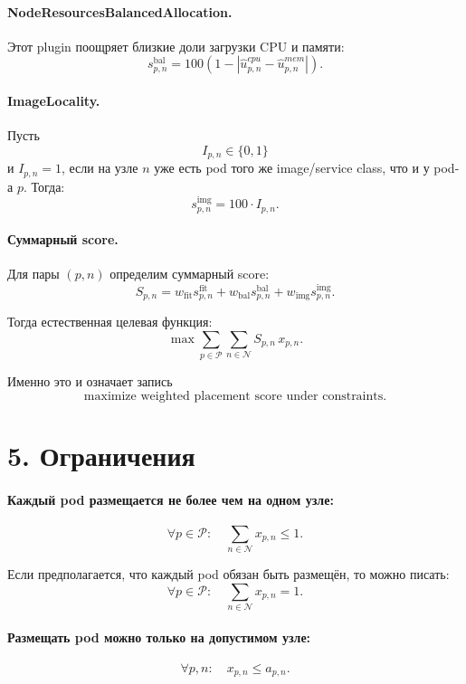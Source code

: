 \documentclass[11pt]{article}
\begin{document}
\paragraph{NodeResourcesBalancedAllocation.}
Этот plugin поощряет близкие доли загрузки CPU и памяти:
\[
  s_{p,n}^{\mathrm{bal}} =
  100\left(1 - \left|\hat{u}^{cpu}_{p,n} - \hat{u}^{mem}_{p,n}\right|\right).
\]

\paragraph{ImageLocality.}
Пусть
\[
  I_{p,n} \in \{0,1\}
\]
и \(I_{p,n}=1\), если на узле \(n\) уже есть pod того же image/service class,
что и у pod-а \(p\). Тогда:
\[
  s_{p,n}^{\mathrm{img}} = 100 \cdot I_{p,n}.
\]

\paragraph{Суммарный score.}
Для пары \((p,n)\) определим суммарный score:
\[
  S_{p,n}
  =
  w_{\mathrm{fit}} s_{p,n}^{\mathrm{fit}}
  +
  w_{\mathrm{bal}} s_{p,n}^{\mathrm{bal}}
  +
  w_{\mathrm{img}} s_{p,n}^{\mathrm{img}}.
\]

Тогда естественная целевая функция:
\[
  \max \sum_{p\in\mathcal{P}} \sum_{n\in\mathcal{N}} S_{p,n}\, x_{p,n}.
\]

Именно это и означает запись
\[
  \text{maximize weighted placement score under constraints.}
\]

\section*{5. Ограничения}

\paragraph{Каждый pod размещается не более чем на одном узле:}
\[
  \forall p\in\mathcal{P}:\quad
  \sum_{n\in\mathcal{N}} x_{p,n} \le 1.
\]

Если предполагается, что каждый pod обязан быть размещён, то можно писать:
\[
  \forall p\in\mathcal{P}:\quad
  \sum_{n\in\mathcal{N}} x_{p,n} = 1.
\]

\paragraph{Размещать pod можно только на допустимом узле:}
\[
  \forall p,n:\quad x_{p,n} \le a_{p,n}.
\]
\end{document}
